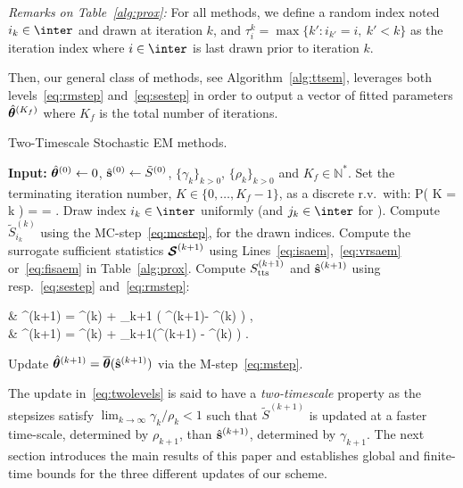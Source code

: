 \documentclass[12pt]{article}
\begin{document}
\medskip
\noindent \emph{Remarks on Table~\ref{alg:prox}:} For all methods, we define a random index noted $i_k \in \inter$ and drawn at iteration $k$, and $\tau_i^k = \max \{ k' : i_{k'} = i,~k' < k \}$ as the iteration index where $i \in \inter$ is last drawn prior to iteration $k$.



Then, our general class of methods, see Algorithm~\ref{alg:ttsem}, leverages both levels~\eqref{eq:rmstep} and~\eqref{eq:sestep} in order to output a vector of fitted parameters $\hat{{\bm{\theta}}}^{({ K}_{ f })}$ where ${ K}_{ f }$ is the total number of iterations.
\begin{algorithm}[H]
\caption{Two-Timescale Stochastic EM methods.}\label{alg:ttsem}
  \begin{algorithmic}[1]
  \STATE \textbf{Input:} $\hat{{\bm{\theta}}}^{(0)} \leftarrow 0$, $\hat{{\mathbf{s}}}^{(0)} \leftarrow \tilde{S}^{(0)}$, $\{\gamma_k\}_{k>0}$, $\{\rho_k\}_{k>0}$ and $ { K}_{ f }\in \mathbb{N}^*$.
  \STATE Set the terminating iteration number, $K \in \{0,\dots,{ K}_{ f }-1\}$, as a discrete r.v.~with:
  \beq \label{eq:random}
   P( K = k ) =  = \eqs.
  \eeq
  \STATE Draw index $i_k \in \inter$ uniformly (and $j_k \in \inter$ for \FISAEM).
     \STATE Compute $\tilde{S}_{i_k}^{(k)}$ using the { MC-step}~\eqref{eq:mcstep},  for the drawn indices.
   \STATE Compute the surrogate sufficient statistics ${\bm{\mathcal{S}}}^{(k+1)}$ using Lines~\ref{eq:isaem},~\ref{eq:vrsaem} or~\ref{eq:fisaem} in Table~\ref{alg:prox}.
   \STATE Compute $S_{\textrm{tts}}^{(k+1)}$ and $\hat{{\mathbf{s}}}^{(k+1)}$ using resp.~\eqref{eq:sestep} and~\eqref{eq:rmstep}:
\beq \label{eq:twolevels}
\begin{split}
& \stt^{(k+1)} = \stt^{(k)} + \rho_{k+1} ( \StocEstep^{(k+1)}- \stt^{(k)}  ) \eqs,\\
&  \hat{\bss}^{(k+1)} =  \hat{\bss}^{(k)}  + \gamma_{k+1}(\stt^{(k+1)} - \hat{\bss}^{(k)} ) \eqs.
\end{split}
\eeq
   \STATE Update $\hat{{\bm{\theta}}}^{(k+1)} = \overline{{\bm{\theta}}}(  \hat{{\mathbf{s}}}^{(k+1)}) $ via the M-step~\eqref{eq:mstep}.
\ENDFOR
  \end{algorithmic}
\end{algorithm}
The update in~\eqref{eq:twolevels} is said to have a \emph{two-timescale} property as the stepsizes satisfy $\lim_{k \to \infty} \gamma_k/\rho_k < 1$ such that $ \tilde{S}^{(k+1)} $  is updated at a faster time-scale, determined by $\rho_{k+1}$, than $\hat{{\mathbf{s}}}^{(k+1)}$, determined by $\gamma_{k+1}$.
The next section introduces the main results of this paper and establishes global and finite-time bounds for the three different updates of our scheme. 
\end{document}
